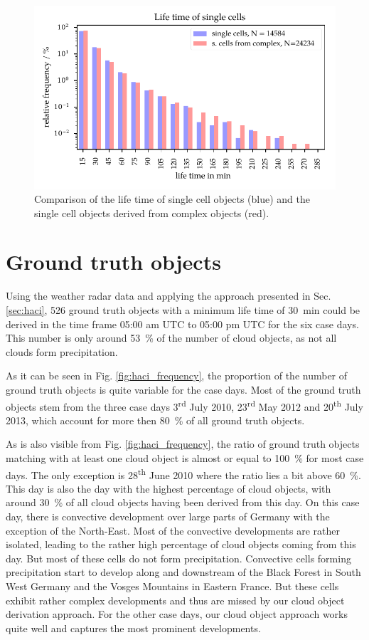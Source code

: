 \begin{figure}[htbp]
\centering
\includegraphics[width=\textwidth]{Grafiken/Abbildungen/single_from_complex_lifetime.pdf}
\caption{Comparison of the life time of single cell objects (blue) and the single cell objects derived from complex objects (red).}
\label{fig:single_cell}
\end{figure}

\section{Ground truth objects}
Using the weather radar data and applying the approach presented in Sec. \ref{sec:haci}, \num{526} ground truth objects with a minimum life time of \SI{30}{\minute} could be derived in the time frame 05:00 am UTC to 05:00 pm UTC for the six case days. This number is only around \SI{53}{\percent} of the number of cloud objects,  as not all clouds form precipitation. 

As it can be seen in Fig. \ref{fig:haci_frequency}, the proportion of the number of ground truth objects is quite variable for the case days. Most of the ground truth objects stem from the three case days 3\textsuperscript{rd} July 2010, 23\textsuperscript{rd} May 2012 and 20\textsuperscript{th} July 2013, which account for more then \SI{80}{\percent} of all ground truth objects. 

As is also visible from Fig. \ref{fig:haci_frequency}, the ratio of ground truth objects matching with at least one cloud object is almost or equal to \SI{100}{\percent} for  most case days. The only exception is 28\textsuperscript{th} June 2010 where the ratio lies a bit above \SI{60}{\percent}. This day is also the day with the highest percentage of cloud objects, with around \SI{30}{\percent} of all cloud objects having been derived from this day. On this case day, there is convective development over large parts of Germany with the exception of the North-East. Most of the convective developments are rather isolated, leading to the rather high percentage of cloud objects coming from this day. But  most of these cells do not form precipitation. Convective cells forming precipitation start to develop along and downstream of the Black Forest in South West Germany and the Vosges Mountains in Eastern France. But these cells exhibit rather complex developments and thus are missed by our cloud object derivation approach.  For the other case days, our cloud object approach works quite well and captures the most prominent developments.

